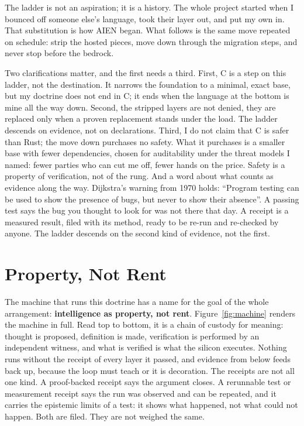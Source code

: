 \documentclass[11pt]{article}
\begin{document}
The ladder is not an aspiration; it is a history. The whole project
started when I bounced off someone else's language, took
their layer out, and put my own in. That substitution is how AIEN
began. What follows is the same move repeated on schedule: strip the
hosted pieces, move down through the migration steps, and never stop
before the bedrock.

Two clarifications matter, and the first needs a third. First, C is a step on this ladder, not the
destination. It narrows the foundation to a minimal, exact base, but
my doctrine does not end in C; it ends when the language at the
bottom is mine all the way down. Second, the stripped layers are not
denied, they are replaced only when a proven replacement stands under
the load. The ladder descends on evidence, not on declarations.
Third, I do not claim that C is safer than Rust; the move down
purchases no safety. What it purchases is a smaller base with fewer
dependencies, chosen for auditability under the threat models I named:
fewer parties who can cut me off, fewer hands on the price. Safety is
a property of verification, not of the rung.
And a word about what counts as evidence along the way. Dijkstra's
warning from 1970 holds: ``Program testing can be used to show the
presence of bugs, but never to show their absence''\cite{dijkstra70}.
A passing test says the bug you thought to look for was not there
that day. A receipt is a measured result, filed with its method,
ready to be re-run and re-checked by anyone. The ladder descends on
the second kind of evidence, not the first.

\section{Property, Not Rent}

The machine that runs this doctrine has a name for the goal of the
whole arrangement: \textbf{intelligence as property, not rent}.
Figure~\ref{fig:machine} renders the machine in full. Read top to
bottom, it is a chain of custody for meaning: thought is proposed,
definition is made, verification is performed by an independent
witness, and what is verified is what the silicon executes. Nothing
runs without the receipt of every layer it passed, and evidence from
below feeds back up, because the loop must teach or it is decoration.
The receipts are not all one kind. A proof-backed receipt says the
argument closes. A rerunnable test or measurement receipt says the run
was observed and can be repeated, and it carries the epistemic limits
of a test: it shows what happened, not what could not happen. Both
are filed. They are not weighed the same.
\end{document}
